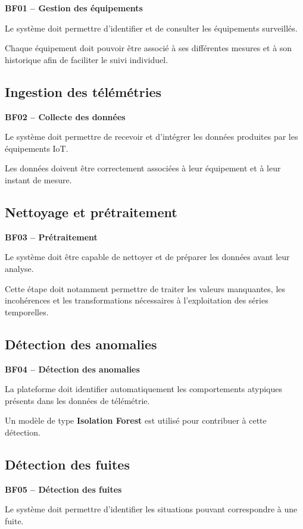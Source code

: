 \textbf{BF01 -- Gestion des équipements}

Le système doit permettre d'identifier et de consulter les équipements
surveillés.

Chaque équipement doit pouvoir être associé à ses différentes mesures et
à son historique afin de faciliter le suivi individuel.

\subsection{Ingestion des télémétries}

\textbf{BF02 -- Collecte des données}

Le système doit permettre de recevoir et d'intégrer les données produites
par les équipements IoT.

Les données doivent être correctement associées à leur équipement et à
leur instant de mesure.

\subsection{Nettoyage et prétraitement}

\textbf{BF03 -- Prétraitement}

Le système doit être capable de nettoyer et de préparer les données avant
leur analyse.

Cette étape doit notamment permettre de traiter les valeurs manquantes,
les incohérences et les transformations nécessaires à l'exploitation des
séries temporelles.

\subsection{Détection des anomalies}

\textbf{BF04 -- Détection des anomalies}

La plateforme doit identifier automatiquement les comportements atypiques
présents dans les données de télémétrie.

Un modèle de type \textbf{Isolation Forest} est utilisé pour contribuer à
cette détection.

\subsection{Détection des fuites}

\textbf{BF05 -- Détection des fuites}

Le système doit permettre d'identifier les situations pouvant correspondre
à une fuite.

